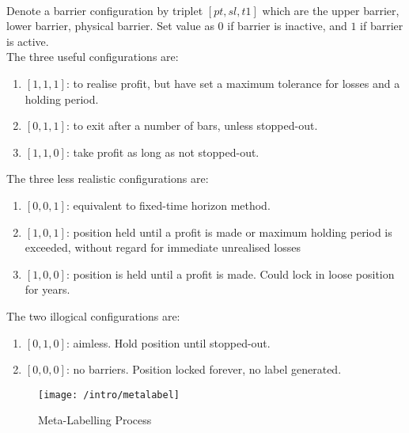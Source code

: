 \begin{remark} \\
Denote a barrier configuration by triplet $[pt, sl, t1]$ which are the upper barrier, lower barrier, physical barrier. Set value as $0$ if barrier is inactive, and $1$ if barrier is active.\\
The three useful configurations are:
\begin{enumerate}[label=\roman*.]
\setlength{\itemsep}{0pt}
\item $[1,1,1]$: to realise profit, but have set a maximum tolerance for losses and a holding period.
\item $[0,1,1]$: to exit after a number of bars, unless stopped-out.
\item $[1,1,0]$: take profit as long as not stopped-out.
\end{enumerate}
The three less realistic configurations are:
\begin{enumerate}[label=\roman*.]
\setlength{\itemsep}{0pt}
\item $[0,0,1]$: equivalent to fixed-time horizon method. 
\item $[1,0,1]$: position held until a profit is made or maximum holding period is exceeded, without regard for immediate unrealised losses
\item $[1,0,0]$: position is held until a profit is made. Could lock in loose position for years.
\end{enumerate}
The two illogical configurations are:
\begin{enumerate}[label=\roman*.]
\setlength{\itemsep}{0pt}
\item $[0,1,0]$: aimless. Hold position until stopped-out.
\item $[0,0,0]$: no barriers. Position locked forever, no label generated.
\end{enumerate}
\end{remark}

\begin{figure}[H]
\centering
\texttt{[image: /intro/metalabel]}
\caption{Meta-Labelling Process}
\end{figure}

